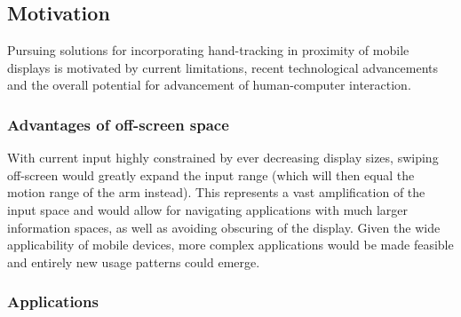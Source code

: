 \begin{comment}
In this project, it is expected that theoretical and practical experience will be obtained through the attempt at exploring a specific instance of a problem within human-computer interaction. This particularly includes learning how computer vision may be applied to the novel interaction concept of combining mid-air gestures with touch interactions. Hence, the learning outcome will serve as an introduction to the utility of computer vision, as well as an introduction to working within an active research field.

In addition, secondary learning outcomes are expected in the broad sense of adhering to a scientific approach, i.e. pursuing the components of structured analysis, method choices, application and finally evaluating and reflecting on obtained results.
\end{comment}


\subsection{Motivation}



Pursuing solutions for incorporating hand-tracking in proximity of mobile displays is motivated by current limitations, recent technological advancements and the overall potential for advancement of human-computer interaction. 



\subsubsection{Advantages of off-screen space}

With current input  highly constrained by ever decreasing display sizes, swiping off-screen would greatly expand the input range (which will then equal the motion range of the arm instead). This represents a vast amplification  of the input space and would allow for navigating applications with much larger information spaces, as well as avoiding obscuring of the display. Given the wide applicability of mobile devices, more complex applications would be made feasible and entirely new usage patterns could  emerge.

\subsubsection{Applications}

